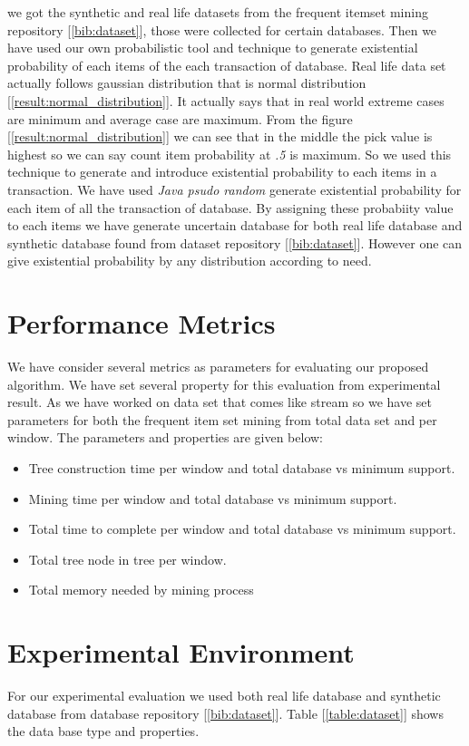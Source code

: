 
we got the synthetic and real life datasets from the frequent itemset mining repository [\ref{bib:dataset}], those were collected for certain databases. Then we have used our own probabilistic tool and technique to generate existential probability of each items of the each transaction of database. Real life data set actually follows gaussian distribution that is normal distribution [\ref{result:normal_distribution}]. It actually says that in real world extreme cases are minimum and average case are maximum. From the figure [\ref{result:normal_distribution}] we can see that in the middle the pick value is highest so we can say count item probability at \emph{.5} is maximum. So we used this technique to generate and introduce existential probability to each items in a transaction. We have used \emph{Java psudo random} generate existential probability for each item of all the transaction of database. By assigning these probabiity value to each items we have generate uncertain database for both real life database and synthetic database found from dataset repository [\ref{bib:dataset}]. However one can give existential probability by any distribution according to need.
\section{Performance Metrics}
We have consider several metrics as parameters for evaluating our proposed algorithm. We have set several property for this evaluation from experimental result. As we have worked on data set that comes like stream so we have set parameters for both the frequent item set mining from total data set and per window. The parameters and properties are given below:

\begin{itemize}
\item Tree construction time per window and total database vs minimum support.
\item Mining time per window and total database vs minimum support.
\item Total time to complete per window and total database vs minimum support.
\item Total tree node in tree per window.
\item Total memory needed by mining process
\end{itemize}
\section{Experimental Environment}
For our experimental evaluation we used both real life database and synthetic database from database repository [\ref{bib:dataset}]. Table [\ref{table:dataset}] shows the data base type and properties.

